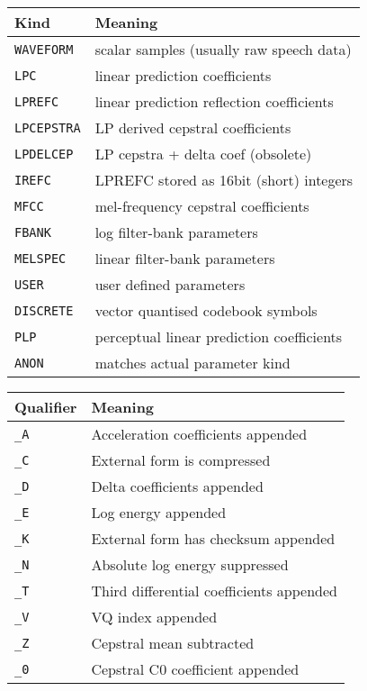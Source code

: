 \begin{center}
\begin{tabular}{|p{2.6cm}|p{8.7cm}|} \hline
Kind &  Meaning  \\ \hline
\texttt{WAVEFORM} & scalar samples (usually raw speech data)  \\
\texttt{LPC} & linear prediction coefficients  \\
\texttt{LPREFC} & linear prediction reflection coefficients  \\
\texttt{LPCEPSTRA}   & LP derived cepstral coefficients  \\
\texttt{LPDELCEP} & LP cepstra + delta coef (obsolete)  \\
\texttt{IREFC} & LPREFC stored as 16bit (short) integers  \\
\texttt{MFCC}  & mel-frequency cepstral coefficients  \\
\texttt{FBANK} & log filter-bank parameters  \\
\texttt{MELSPEC} & linear filter-bank parameters  \\
\texttt{USER} & user defined parameters  \\
\texttt{DISCRETE} &  vector quantised codebook symbols  \\
\texttt{PLP} &  perceptual linear prediction coefficients  \\
\texttt{ANON} & matches actual parameter kind \\ \hline
\end{tabular}
\end{center}

\begin{center}
\begin{tabular}{|p{2.6cm}|p{8.7cm}|} \hline
Qualifier &  Meaning  \\ \hline
\texttt{\_A} &  Acceleration coefficients appended \\
\texttt{\_C} &  External form is compressed\\
\texttt{\_D} &  Delta coefficients appended \\
\texttt{\_E} &  Log energy appended\\
\texttt{\_K} &  External form has checksum appended\\
\texttt{\_N} &  Absolute log energy suppressed \\
\texttt{\_T} &  Third differential coefficients appended \\
\texttt{\_V} &  VQ index appended\\
\texttt{\_Z} &  Cepstral mean subtracted\\
\texttt{\_0} &  Cepstral C0 coefficient appended\\ \hline
\end{tabular}
\end{center}

